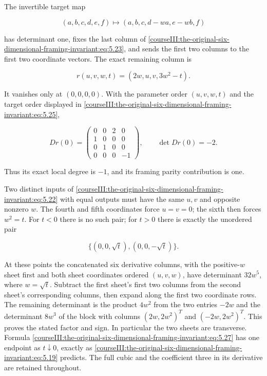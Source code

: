 The invertible target map

\begin{equation}
(a,b,c,d,e,f)\longmapsto(a,b,c,d-wa,e-wb,f)
 \label{courseIII:the-original-six-dimensional-framing-invariant:eq:5.24}
\end{equation}

has determinant one, fixes the last column of \eqref{courseIII:the-original-six-dimensional-framing-invariant:eq:5.23}, and sends the first two columns to the first two coordinate vectors. The exact remaining column is

\begin{equation}
r(u,v,w,t)=(2w,u,v,3w^2-t).
 \label{courseIII:the-original-six-dimensional-framing-invariant:eq:5.25}
\end{equation}

It vanishes only at \((0,0,0,0)\). With the parameter order \((u,v,w,t)\) and the target order displayed in \eqref{courseIII:the-original-six-dimensional-framing-invariant:eq:5.25},

\begin{equation}
Dr(0)=
 \begin{pmatrix}
 0&0&2&0\\
 1&0&0&0\\
 0&1&0&0\\
 0&0&0&-1
 \end{pmatrix},\qquad
                 \det Dr(0)=-2.
 \label{courseIII:the-original-six-dimensional-framing-invariant:eq:5.26}
\end{equation}

Thus its exact local degree is \(-1\), and its framing parity contribution is one.

Two distinct inputs of \eqref{courseIII:the-original-six-dimensional-framing-invariant:eq:5.22} with equal outputs must have the same \(u,v\) and opposite nonzero \(w\). The fourth and fifth coordinates force \(u=v=0\); the sixth then forces \(w^2=t\). For \(t<0\) there is no such pair; for \(t>0\) there is exactly the unordered pair

\begin{equation}
\{(0,0,\sqrt t),(0,0,-\sqrt t)\}.
 \label{courseIII:the-original-six-dimensional-framing-invariant:eq:5.27}
\end{equation}

At these points the concatenated six derivative columns, with the positive-\(w\) sheet first and both sheet coordinates ordered \((u,v,w)\), have determinant \(32w^5\), where \(w=\sqrt t\). Subtract the first sheet's first two columns from the second sheet's corresponding columns, then expand along the first two coordinate rows. The remaining determinant is the product \(4w^2\) from the two entries \(-2w\) and the determinant \(8w^3\) of the block with columns \((2w,2w^2)^T\) and \((-2w,2w^2)^T\). This proves the stated factor and sign. In particular the two sheets are transverse. Formula \eqref{courseIII:the-original-six-dimensional-framing-invariant:eq:5.27} has one endpoint as \(t\downarrow0\), exactly as \eqref{courseIII:the-original-six-dimensional-framing-invariant:eq:5.19} predicts. The full cubic and the coefficient three in its derivative are retained throughout.

